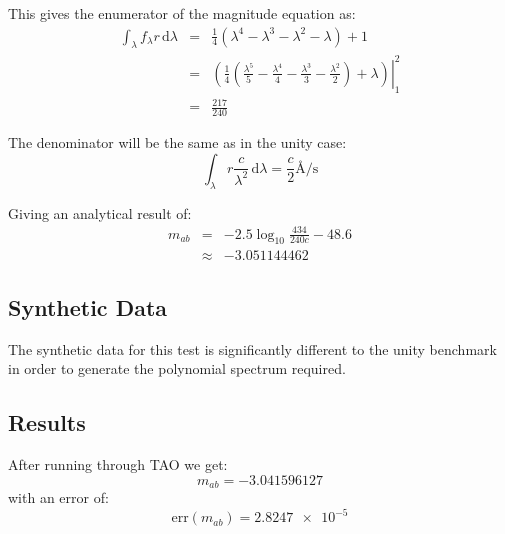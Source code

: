 \documentclass[12pt]{scrartcl}
\newcommand{\dx}[1]{\ensuremath{\,\mathrm{d}#1}}
\begin{document}
This gives the enumerator of the magnitude equation as:
\begin{eqnarray*}
\int_\lambda f_\lambda r \dx{\lambda}
& = & \frac{1}{4}\left(
  \lambda^4 - \lambda^3 - \lambda^2 - \lambda
  \right) + 1 \\
& = & \left. \left( \frac{1}{4}\left(
  \frac{\lambda^5}{5} - \frac{\lambda^4}{4} - \frac{\lambda^3}{3} - \frac{\lambda^2}{2}
  \right) + \lambda \right) \right|_1^2 \\
& = & \frac{217}{240}
\end{eqnarray*}

The denominator will be the same as in the unity case:
\[ \int_\lambda r \frac{c}{\lambda^2} \dx{\lambda} = \frac{c}{2} \si{\angstrom\per\second} \]

Giving an analytical result of:
\begin{eqnarray*}
m_{ab} & = & -2.5\log_{10} \frac{434}{240c} - 48.6 \\
& \approx & -3.051144462
\end{eqnarray*}

\subsection{Synthetic Data}

The synthetic data for this test is significantly different to the unity
benchmark in order to generate the polynomial spectrum required.

\subsection{Results}

After running through TAO we get:
\[ m_{ab} = -3.041596127 \]
with an error of:
\[ \mathrm{err}(m_{ab}) = \num{2.8247e-5} \]






\end{document}
